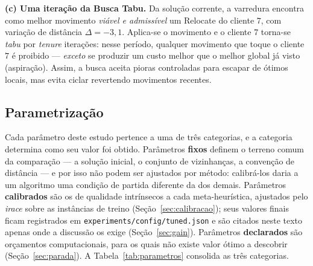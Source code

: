 \documentclass[12pt, a4paper]{article}
\begin{document}
\textbf{(c) Uma iteração da Busca Tabu.} Da solução corrente, a varredura encontra como melhor movimento \emph{viável e admissível} um Relocate do cliente $7$, com variação de distância $\Delta=-3{,}1$. Aplica-se o movimento e o cliente $7$ torna-se \emph{tabu} por \textit{tenure} iterações: nesse período, qualquer movimento que toque o cliente $7$ é proibido --- \emph{exceto} se produzir um custo melhor que o melhor global já visto (aspiração). Assim, a busca aceita pioras controladas para escapar de ótimos locais, mas evita ciclar revertendo movimentos recentes.

\subsection{Parametrização}\label{sec:parametrizacao}
Cada parâmetro deste estudo pertence a uma de três categorias, e a categoria determina como seu valor foi obtido. Parâmetros \textbf{fixos} definem o terreno comum da comparação --- a solução inicial, o conjunto de vizinhanças, a convenção de distância --- e por isso não podem ser ajustados por método: calibrá-los daria a um algoritmo uma condição de partida diferente da dos demais. Parâmetros \textbf{calibrados} são os de qualidade intrínsecos a cada meta-heurística, ajustados pelo \textit{irace} sobre as instâncias de treino (Seção~\ref{sec:calibracao}); seus valores finais ficam registrados em \texttt{experiments/config/tuned.json} e são citados neste texto apenas onde a discussão os exige (Seção~\ref{sec:gain}). Parâmetros \textbf{declarados} são orçamentos computacionais, para os quais não existe valor ótimo a descobrir (Seção~\ref{sec:parada}). A Tabela~\ref{tab:parametros} consolida as três categorias.
\end{document}
